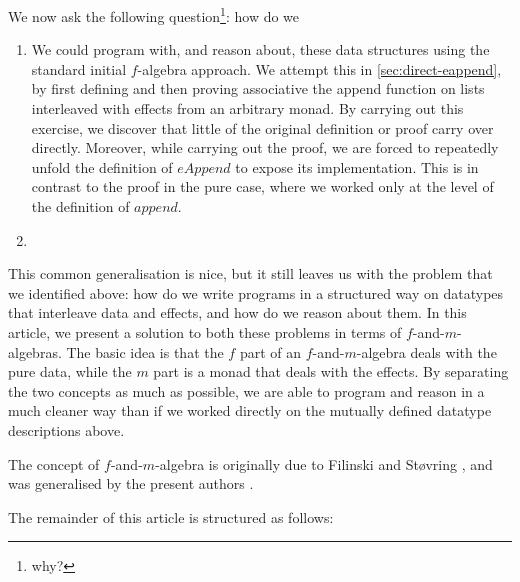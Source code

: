 We now ask the following question\footnote{why?}: how do we 

\begin{enumerate}
\item We could program with, and reason about, these data structures
  using the standard initial $f$-algebra approach. We attempt this in
  \autoref{sec:direct-eappend}, by first defining and then proving
  associative the append function on lists interleaved with effects
  from an arbitrary monad. By carrying out this exercise, we discover
  that little of the original definition or proof carry over
  directly. Moreover, while carrying out the proof, we are forced to
  repeatedly unfold the definition of $\mathit{eAppend}$ to expose its
  implementation. This is in contrast to the proof in the pure case,
  where we worked only at the level of the definition of
  $\mathit{append}$.
\item 
\end{enumerate}

This common generalisation is nice, but it still leaves us with the
problem that we identified above: how do we write programs in a
structured way on datatypes that interleave data and effects, and how
do we reason about them. In this article, we present a solution to
both these problems in terms of $f$-and-$m$-algebras. The basic idea
is that the $f$ part of an $f$-and-$m$-algebra deals with the pure
data, while the $m$ part is a monad that deals with the effects. By
separating the two concepts as much as possible, we are able to
program and reason in a much cleaner way than if we worked directly on
the mutually defined datatype descriptions above.

The concept of $f$-and-$m$-algebra is originally due to Filinski and
St\o{}vring \cite{filinski07inductive}, and was generalised by the
present authors \cite{atkey12fibrational}. 

The remainder of this article is structured as follows:

